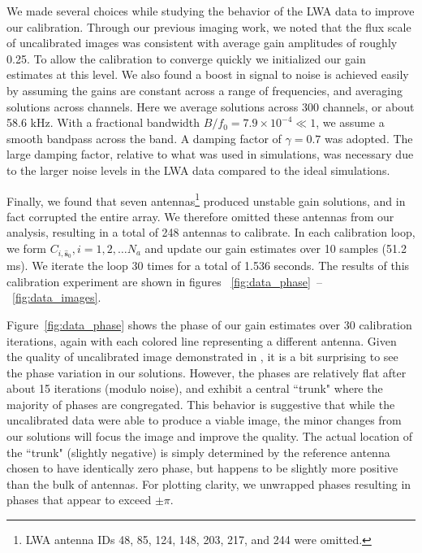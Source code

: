 \documentclass[a4paper,fleqn,usenatbib]{mnras}
\begin{document}
We made several choices while studying the behavior of the LWA data to improve our 
calibration. Through our previous imaging work, we noted that the flux scale of uncalibrated 
images was consistent with average gain amplitudes of roughly 0.25. To allow the calibration to 
converge quickly we initialized our gain estimates at this level. 
We also found a boost in signal to noise is achieved easily by assuming the gains are
constant across a range of frequencies, and averaging solutions across channels.
Here we average solutions across 300 channels, or about 58.6 kHz. 
With a fractional bandwidth $B/f_0 = 7.9 \times 10^{-4} \ll 1$, we assume a smooth bandpass 
across the band. 
A damping factor of $\gamma = 0.7$ was adopted.
The large damping factor, relative to what was used in simulations, was necessary due to
the larger noise levels in the LWA data compared to the ideal simulations.

Finally, we found that seven antennas\footnote{LWA antenna IDs 48, 85, 124, 148, 203, 217, 
and 244 were omitted.} produced unstable gain solutions, and in fact corrupted the entire array. 
We therefore omitted these antennas from our analysis, resulting in a total of 248 antennas to 
calibrate. In each calibration loop, we form $C_{i,\hat{\boldsymbol{s}}_0}, i=1,2,\ldots N_a$ and 
update our gain estimates over 10 samples (51.2 ms). We iterate the loop 30 times for a 
total of 1.536 seconds. The results of this calibration experiment are shown in figures~
\ref{fig:data_phase}~--~\ref{fig:data_images}.

Figure~\ref{fig:data_phase} shows the phase of our gain estimates over 30 calibration 
iterations, again with each colored line representing a different antenna. Given the quality of 
uncalibrated image demonstrated in \cite{thy15c}, it is a bit surprising to see the phase 
variation in our solutions. However, the phases are relatively flat after about 15 iterations 
(modulo noise), and exhibit a central ``trunk" where the majority of phases are congregated. 
This behavior is suggestive that while the uncalibrated data were able to produce a viable 
image, the minor changes from our solutions will focus the image and improve the quality. The 
actual location of the ``trunk" (slightly negative) is simply determined by the reference antenna 
chosen to have identically zero phase, but happens to be slightly more positive than the bulk of 
antennas. For plotting clarity, we unwrapped phases resulting in phases that appear to exceed 
$\pm \pi$.
\end{document}
